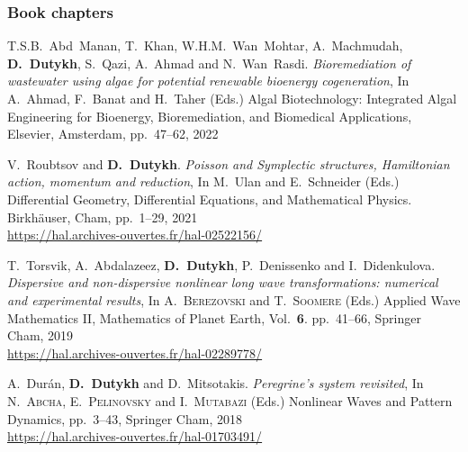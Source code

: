 \separator
\subsubsection{Book chapters}

\begin{etaremune}


  
  \item T.S.B.~Abd~Manan, T.~Khan, W.H.M.~Wan~Mohtar, A.~Machmudah, \textbf{D.~Dutykh}, S.~Qazi, A.~Ahmad and N.~Wan~Rasdi. \textit{Bioremediation of wastewater using algae for potential renewable bioenergy cogeneration}, In A.~Ahmad, F.~Banat and H.~Taher (Eds.) Algal Biotechnology: Integrated Algal Engineering for Bioenergy, Bioremediation, and Biomedical Applications, Elsevier, Amsterdam, pp.~47--62, 2022 %


  
  \item V.~Roubtsov and \textbf{D.~Dutykh}. \textit{Poisson and Symplectic structures, Hamiltonian action, momentum and reduction}, In M.~Ulan and E.~Schneider (Eds.) Differential Geometry, Differential Equations, and Mathematical Physics. Birkh\"auser, Cham, pp.~1--29, 2021 \\ %
  \url{https://hal.archives-ouvertes.fr/hal-02522156/}



  \item T.~Torsvik, A.~Abdalazeez, \textbf{D.~Dutykh}, P.~Denissenko and I.~Didenkulova. \textit{Dispersive and non-dispersive nonlinear long wave transformations: numerical and experimental results}, In A.~\textsc{Berezovski} and T.~\textsc{Soomere} (Eds.) Applied Wave Mathematics II, Mathematics of Planet Earth, Vol.~\textbf{6}. pp.~41--66, Springer Cham, 2019 \\ %
  \url{https://hal.archives-ouvertes.fr/hal-02289778/}
  


  \item A.~Dur\'an, \textbf{D.~Dutykh} and D.~Mitsotakis. \textit{Peregrine's system revisited}, In N.~\textsc{Abcha}, E.~\textsc{Pelinovsky} and I.~\textsc{Mutabazi} (Eds.) Nonlinear Waves and Pattern Dynamics, pp.~3--43, Springer Cham, 2018 \\ %
  \url{https://hal.archives-ouvertes.fr/hal-01703491/}
  

\end{etaremune}
